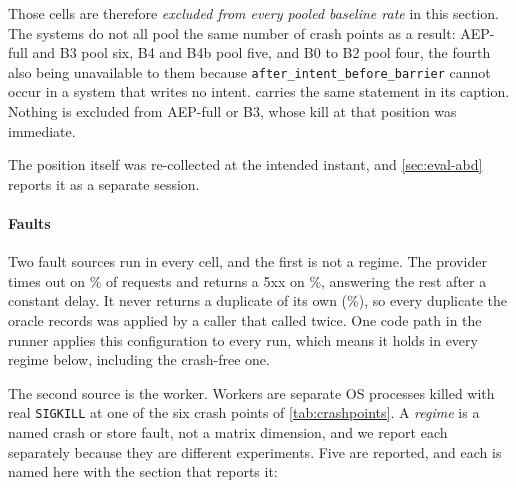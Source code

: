 Those cells are therefore \emph{excluded from every pooled baseline rate} in
this section. The systems do not all pool the same number of crash points as a
result: AEP-full and B3 pool six, B4 and B4b pool five, and B0 to B2 pool four,
the fourth also being unavailable to them because
\texttt{after\_intent\_before\_barrier} cannot occur in a system that writes no
intent.  carries the same statement in its caption. Nothing
is excluded from AEP-full or B3, whose kill at that position was immediate.

The position itself was re-collected at the intended instant, and
\cref{sec:eval-abd} reports it as a separate session.

\paragraph{Faults} Two fault sources run in every cell, and the first is not a
regime. The provider times out on \ProviderTimeoutPct{}\% of requests and
returns a 5xx on \ProviderErrorPct{}\%, answering the rest after a constant
delay. It never returns a duplicate of its own
(\ProviderDuplicatePct{}\%), so every duplicate the oracle records was applied
by a caller that called twice. One code path in the runner applies this
configuration to every run, which means it holds in every regime below,
including the crash-free one.

The second source is the worker. Workers are separate OS processes killed with
real \texttt{SIGKILL} at one of the six crash points of
\cref{tab:crashpoints}. A \emph{regime} is a named crash or store fault, not a
matrix dimension, and we report each separately because they are different
experiments. Five are reported, and each is named here with the section that
reports it:

